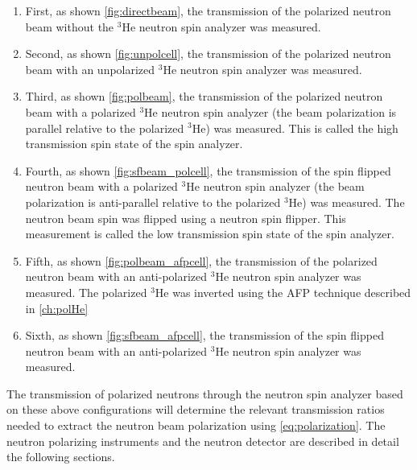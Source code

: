 \begin{enumerate}
    \item First, as shown \cref{fig:directbeam}, the transmission of the polarized neutron beam without the $^3$He neutron spin analyzer was measured.
    \item Second, as shown \cref{fig:unpolcell}, the transmission of the polarized neutron beam with an unpolarized $^3$He neutron spin analyzer was measured.
    \item Third, as shown \cref{fig:polbeam}, the transmission of the polarized neutron beam with a polarized $^3$He neutron spin analyzer (the beam polarization is parallel relative to the polarized $^3$He) was measured. This is called the high transmission spin state of the spin analyzer.
    \item Fourth, as shown \cref{fig:sfbeam_polcell}, the transmission of the spin flipped neutron beam with a polarized $^3$He neutron spin analyzer (the beam polarization is anti-parallel relative to the polarized $^3$He) was measured. The neutron beam spin was flipped using a neutron spin flipper. This measurement is called the low transmission spin state of the spin analyzer.
    \item Fifth, as shown \cref{fig:polbeam_afpcell}, the transmission of the polarized neutron beam with an anti-polarized $^3$He neutron spin analyzer was measured. The polarized $^3$He was inverted using the AFP technique described in \cref{ch:polHe}
    \item Sixth, as shown \cref{fig:sfbeam_afpcell}, the transmission of the spin flipped neutron beam with an anti-polarized $^3$He neutron spin analyzer was measured.
\end{enumerate}
The transmission of polarized neutrons through the neutron spin analyzer based on these above configurations will determine the relevant transmission ratios needed to extract the neutron beam polarization using \cref{eq:polarization}. The neutron polarizing instruments and the neutron detector are described in detail the following sections.



